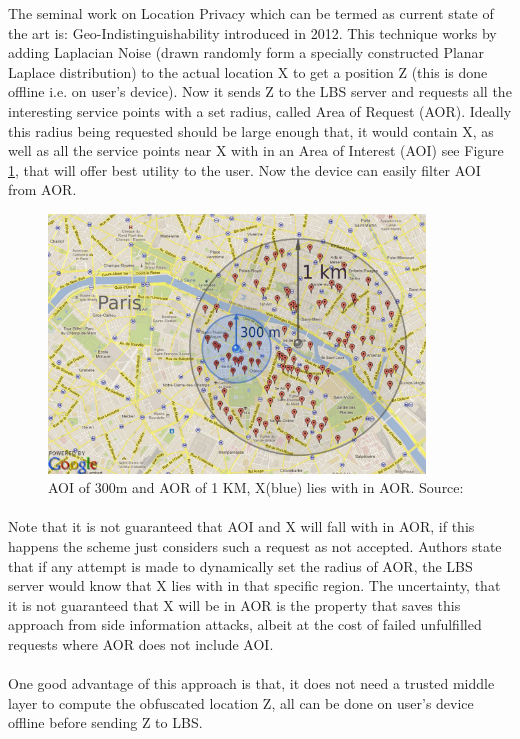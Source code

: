 \documentclass{report}
\begin{document}
The seminal work on Location Privacy which can be termed as current state of the art is: Geo-Indistinguishability \cite{andres2013geo} introduced in 2012. This technique works by adding Laplacian Noise (drawn randomly form a specially constructed Planar Laplace distribution) to the actual location X to get a position Z (this is done offline i.e. on user's device). Now it sends Z to the LBS server and requests all the interesting service points with a set radius, called Area of Request (AOR). Ideally this radius being requested should be large enough that, it would contain X, as well as all the service points near X with in an Area of Interest (AOI) see Figure \ref{fig:AOIvsAOR}, that will offer best utility to the user. Now the device can easily filter AOI from AOR.
\begin{figure}[ht]
\centering
        \includegraphics[width=100mm,scale=1]{Images/AOIvsAOR.PNG}
    \caption{AOI of 300m and AOR of 1 KM, X(blue) lies with in AOR. Source:\cite{andres2013geo}}
    \label{fig:AOIvsAOR}
\end{figure}

\paragraph{}
Note that it is not guaranteed that  AOI and X will fall with in AOR, if this happens the scheme just considers such a request as not accepted. Authors state that if any attempt is made to dynamically set the radius of AOR, the LBS server would know that X lies with in that specific region. The uncertainty, that it is not guaranteed that X will be in AOR is the property that saves this approach from side information attacks, albeit at the cost of failed unfulfilled requests where AOR does not include AOI.
\paragraph{}
One good advantage of this approach is that, it does not need a trusted middle layer to compute the obfuscated location Z, all can be done on user's device offline before sending Z to LBS.
\end{document}
